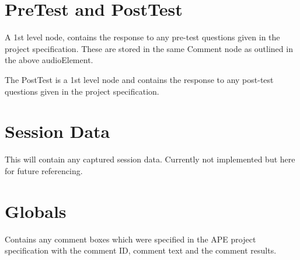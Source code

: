 \documentclass{article}
\begin{document}
\section{PreTest and PostTest}
A 1st level node, contains the response to any pre-test questions given in the project specification. These are stored in the same Comment node as outlined in the above audioElement.

The PostTest is a 1st level node and contains the response to any post-test questions given in the project specification.

\section{Session Data}
This will contain any captured session data. Currently not implemented but here for future referencing.

\section{Globals}
Contains any comment boxes which were specified in the APE project specification with the comment ID, comment text and the comment results.
\end{document}
